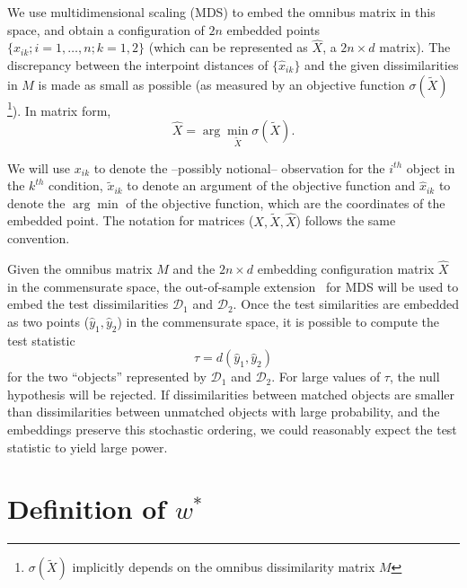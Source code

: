 \documentclass[12pt,oneside,final]{thesis}\usepackage[]{graphicx}\usepackage[]{color}
\begin{document}
 We use multidimensional scaling (MDS) \cite{borg+groenen:1997} to embed  the omnibus matrix in this  space, and obtain  a configuration of $2n$ embedded points $\{\hat{x}_{ik}; i=1,\ldots,n;k=1,2\}$ (which can be represented as $\hat{X}$, a $2n \times d$ matrix). The discrepancy between the interpoint distances of $\{\hat{x}_{ik}\}$ and the given dissimilarities in  $M$ is made as small  as possible (as measured by an objective function $\sigma(\widetilde{X})$ \footnote{$\sigma(\widetilde{X})$ implicitly depends on the omnibus dissimilarity matrix $M$}). In matrix form, $$ \hat{X}=\arg \min_{\tilde{X}} \sigma(\tilde{X}).$$ 

\begin{remark} 
We will use $x_{ik}$ to denote the --possibly notional--  observation  for the $i^{th}$ object in the $k^{th}$ condition, $\tilde{x}_{ik}$ to denote an argument of the objective function  and  $\hat{x}_{ik}$  to denote the $\arg\min$  of the objective function, which are the coordinates of the embedded point. The notation for matrices ($X,\tilde{X},\hat{X}$) follows the  same convention.
\end{remark}

  Given the omnibus matrix $M$ and the $2n \times d$ embedding configuration matrix $\hat{X}$ in the commensurate space, the out-of-sample extension~\cite{TrossetOOS} for MDS will be used to embed the test dissimilarities $\mathcal{D}_1$ and $\mathcal{D}_2$.  Once the test similarities are embedded as two points ($\hat{y}_{1},\hat{y}_{2}$) in  the commensurate space, it is possible to  compute the test statistic \[
\tau=d\left(\hat{y}_{1},\hat{y}_{2}\right)\label{teststat}
\] for the two ``objects'' represented by  $\mathcal{D}_1$ and $\mathcal{D}_2$.  For large values of $\tau$, the null hypothesis will be rejected. 
   If  dissimilarities between matched objects are smaller than dissimilarities between unmatched objects with large probability, and the embeddings preserve this stochastic ordering,  we could reasonably expect the test statistic to yield large  power. 
   
   

\section{Definition of  $w^{*}$}
\end{document}
